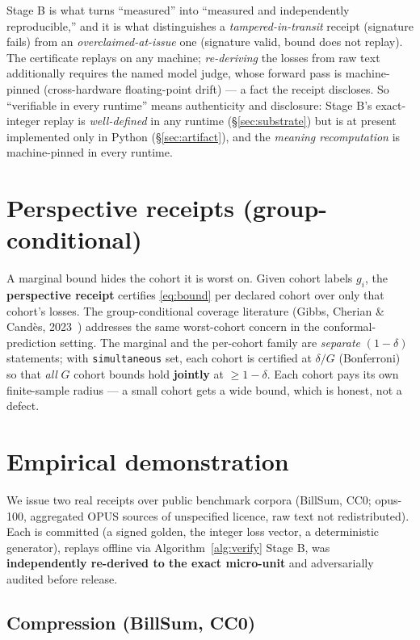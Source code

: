 \documentclass[11pt]{article}
\theoremstyle{definition}
\begin{document}
Stage B is what turns ``measured'' into ``measured and independently
reproducible,'' and it is what distinguishes a \emph{tampered-in-transit}
receipt (signature fails) from an \emph{overclaimed-at-issue} one (signature
valid, bound does not replay). The certificate replays on any machine;
\emph{re-deriving} the losses from raw text additionally requires the named
model judge, whose forward pass is machine-pinned (cross-hardware
floating-point drift) --- a fact the receipt discloses. So ``verifiable in
every runtime'' means authenticity and disclosure: Stage B's exact-integer
replay is \emph{well-defined} in any runtime (\S\ref{sec:substrate}) but is at
present implemented only in Python (\S\ref{sec:artifact}), and the
\emph{meaning recomputation} is machine-pinned in every runtime.

\section{Perspective receipts (group-conditional)}\label{sec:perspective}

A marginal bound hides the cohort it is worst on. Given cohort labels
$g_i$, the \textbf{perspective receipt} certifies \eqref{eq:bound} per
declared cohort over only that cohort's losses. The group-conditional
coverage literature (Gibbs, Cherian \& Cand\`es, 2023~\cite{gibbs2023})
addresses the same worst-cohort concern in the conformal-prediction
setting. The marginal and the per-cohort family are
\emph{separate} $(1-\delta)$ statements; with \texttt{simultaneous} set,
each cohort is certified at $\delta/G$ (Bonferroni) so that \emph{all} $G$
cohort bounds hold \textbf{jointly} at $\ge 1-\delta$. Each cohort pays its
own finite-sample radius --- a small cohort gets a wide bound, which is
honest, not a defect.

\section{Empirical demonstration}\label{sec:empirical}

We issue two real receipts over public benchmark corpora (BillSum, CC0;
opus-100, aggregated OPUS sources of unspecified licence, raw text not
redistributed). Each is committed (a
signed golden, the integer loss vector, a deterministic generator), replays
offline via Algorithm~\ref{alg:verify} Stage B, was \textbf{independently
re-derived to the exact micro-unit} and adversarially audited before
release.

\subsection{Compression (BillSum, CC0)}\label{sec:billsum}
\end{document}
